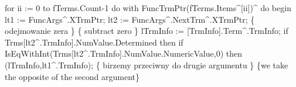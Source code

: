                         for ii := 0 to fTerms.Count-1 do
                           with FuncTrmPtr(fTerms.Items^[ii])^ do
                        begin
                           lt1 := FuncArgs^.XTrmPtr; lt2 := FuncArgs^.NextTrm^.XTrmPtr;
                           \{ odejmowanie zera \} \{ subtract zero \}
                           lTrmInfo := [TrmInfo].Term^.TrmInfo;
                           if Trms[lt2^.TrmInfo].NumValue.Determined then
                              if IsEqWithInt(Trms[lt2^.TrmInfo].NumValue.NumericValue,0) then
                                 (lTrmInfo,lt1^.TrmInfo);
                           \{ birzemy przeciwny do drugie argumentu \}
                           \{we take the opposite of the second argument\}
                           
